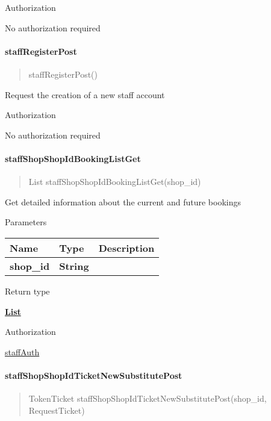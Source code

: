 Authorization

No authorization required

\hypertarget{staffregisterpost}{%
\paragraph{\texorpdfstring{\textbf{staffRegisterPost}}{staffRegisterPost}}\label{staffregisterpost}}

\begin{quote}
staffRegisterPost()
\end{quote}

Request the creation of a new staff account

Authorization

No authorization required

\hypertarget{staffshopshopidbookinglistget}{%
\paragraph{\texorpdfstring{\textbf{staffShopShopIdBookingListGet}}{staffShopShopIdBookingListGet}}\label{staffshopshopidbookinglistget}}

\begin{quote}
List staffShopShopIdBookingListGet(shop\_id)
\end{quote}

Get detailed information about the current and future bookings

Parameters

\begin{longtable}[]{@{}lll@{}}
\toprule
Name & Type & Description\tabularnewline
\midrule
\endhead
\textbf{shop\_id} & \textbf{String} &\tabularnewline
\bottomrule
\end{longtable}

Return type

\href{../Models/TokenBooking.md}{\textbf{List}}

Authorization

\href{../README.md\#staffAuth}{staffAuth}

\hypertarget{staffshopshopidticketnewsubstitutepost}{%
\paragraph{\texorpdfstring{\textbf{staffShopShopIdTicketNewSubstitutePost}}{staffShopShopIdTicketNewSubstitutePost}}\label{staffshopshopidticketnewsubstitutepost}}

\begin{quote}
TokenTicket staffShopShopIdTicketNewSubstitutePost(shop\_id,
RequestTicket)
\end{quote}


